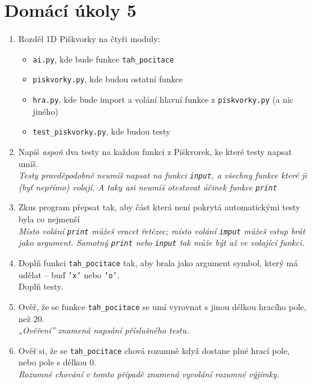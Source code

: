 \documentclass[a4paper,10pt]{article}
\newcommand\plsetno{5}
\begin{document}
\section*{Domácí úkoly \plsetno}

\begin{enumerate}
\item Rozděl 1D Piškvorky na čtyři moduly:
    \begin{itemize}
        \item \texttt{ai.py}, kde bude funkce \texttt{tah\_pocitace}
        \item \texttt{piskvorky.py}, kde budou ostatní funkce
        \item \texttt{hra.py}, kde bude import a volání hlavní funkce z \texttt{piskvorky.py} (a nic jiného)
        \item \texttt{test\_piskvorky.py}, kde budou testy
    \end{itemize}

\item Napiš \emph{aspoň} dva testy na každou funkci z Piškvorek, ke které testy napsat umíš.
    \\\emph{\small Testy pravděpodobně neumíš napsat na funkci \texttt{input}, a všechny funkce které ji (byť nepřímo) volají.
            A taky asi neumíš otestovat účinek funkce \texttt{print}}

\item Zkus program přepsat tak, aby část která není pokrytá automatickými testy byla co nejmenší
    \\\emph{\small Místo volání \texttt{print} můžeš vracet řetězec;
            místo volání \texttt{imput} můžeš vstup brát jako argument.
            Samotný \texttt{print} nebo \texttt{input} tak může být až ve volající funkci.}

\item Doplň funkci \texttt{tah\_pocitace} tak, aby brala jako argument symbol, který má udělat – buď \texttt{'x'} nebo \texttt{'o'}.
    \\Doplň testy.

\item Ověř, že se funkce \texttt{tah\_pocitace} se umí vyrovnat s jinou délkou hracího pole, než 20.
    \\\emph{\small „Ověření” znamená napsání příslušného testu.}

\item Ověř si, že se \texttt{tah\_pocitace} chová rozumně když dostane plné hrací pole, nebo pole s délkou 0.
    \\\emph{\small Rozumné chování v tomto případě znamená vyvolání rozumné výjimky.}


\end{enumerate}
\end{document}
